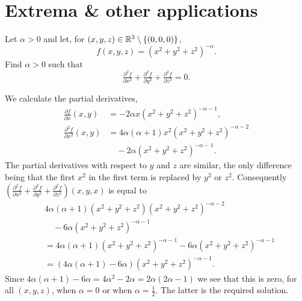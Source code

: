 \section{Extrema \& other applications}

\begin{task}
    Let \(\alpha>0\) and let, for \((x,y,z)\in \mathbb{R}^3 \setminus \{(0,0,0)\}\),
    \[
        f(x,y,z) = {(x^2 + y^2 + z^2)}^{-\alpha}.
    \]
    Find \(\alpha>0\) such that
    \[
        \tfrac{\partial^2 f}{\partial x^2} + \tfrac{\partial^2 f}{\partial y^2}  +\tfrac{\partial^2 f}{\partial z^2}  =0.
    \]
\end{task}

\begin{solution}
    We calculate the partial derivatives,
    \[
        \begin{aligned}
            \tfrac{\partial f}{\partial x}(x,y)
             & = -2 \alpha x{(x^2 + y^2 + z^2)}^{-\alpha-1},           \\
            \tfrac{\partial^2 f}{\partial x^2}(x,y)
             & = 4 \alpha(\alpha+1) x^2{(x^2 + y^2 + z^2)}^{-\alpha-2} \\
             & \quad -2 \alpha {(x^2 + y^2 + z^2)}^{-\alpha-1}.
        \end{aligned}
    \]
    The partial derivatives with respect to \(y\) and \(z\) are similar, the only difference being that the first \(x^2\) in the first term is replaced by \(y^2\) or \(z^2\).
    Consequently \(\left(\tfrac{\partial^2 f}{\partial x^2} + \tfrac{\partial^2 f}{\partial y^2}  +\tfrac{\partial^2 f}{\partial z^2}\right)(x,y,x)\) is equal to
    \[
        \begin{aligned}
             & 4 \alpha(\alpha+1)( x^2 + y^2 + z^2){(x^2 + y^2 + z^2)}^{-\alpha-2} \\
             & \quad -6 \alpha {(x^2 + y^2 + z^2)}^{-\alpha-1}                     \\
             & =  4 \alpha(\alpha+1){(x^2 + y^2 + z^2)}^{-\alpha-1}                %
            -6 \alpha {(x^2 + y^2 + z^2)}^{-\alpha-1}                              \\
             & = (4 \alpha(\alpha+1) -6 \alpha ) {(x^2 + y^2 + z^2)}^{-\alpha-1}.
        \end{aligned}
    \]
    Since \(4 \alpha(\alpha+1) - 6 \alpha = 4\alpha^2 - 2\alpha = 2\alpha(2\alpha -1)\) we see that this is zero, for all \((x,y,z)\), when \(\alpha=0\) or when \(\alpha = \frac{1}{2}\).
    The latter is the required solution.
\end{solution}


